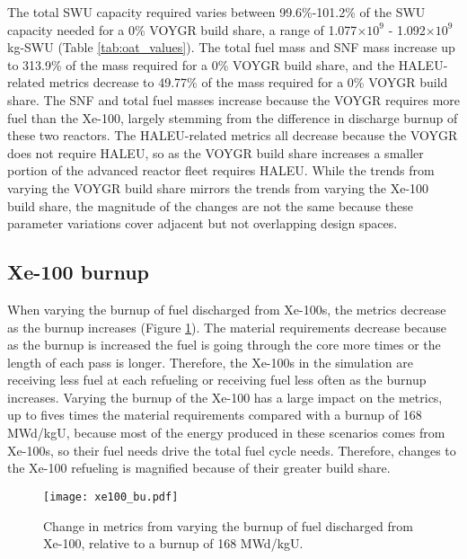 The total \gls{SWU} capacity required varies between 99.6\%-101.2\% of the 
\gls{SWU} capacity needed for a 0\% VOYGR build share, a range of 1.077$\times 10^9$
- 1.092$\times 10^9$ kg-SWU (Table \ref{tab:oat_values}). The total fuel mass 
and \gls{SNF} mass increase 
up to 313.9\% of the mass required for a 0\% VOYGR build share, and the 
\gls{HALEU}-related metrics decrease to 49.77\% of the mass required 
for a 0\% VOYGR build share. The \gls{SNF} and total fuel masses increase 
because the VOYGR requires more fuel than the Xe-100, largely stemming from 
the difference in discharge burnup of these two reactors. The \gls{HALEU}-related 
metrics all decrease because the VOYGR does not require \gls{HALEU}, so as the 
VOYGR build share increases a smaller portion of the advanced reactor fleet 
requires \gls{HALEU}. While the trends from varying the VOYGR build share 
mirrors the trends from varying the Xe-100 build share, the magnitude of the 
changes are not the same because these 
parameter variations cover adjacent but not overlapping design spaces. 

\subsection{Xe-100 burnup}
When varying the burnup of fuel discharged from Xe-100s, the metrics decrease 
as the burnup increases (Figure \ref{fig:xe100_bu_s7}). The material 
requirements decrease because as 
the burnup is increased the fuel is going through the core more times or the 
length of each pass is longer. Therefore, the Xe-100s in the simulation are receiving 
less fuel at each refueling or receiving fuel less often as the burnup increases. 
Varying the burnup of the Xe-100 has a large impact on the metrics, up to fives times 
the material requirements compared with a burnup of 168 MWd/kgU, because most of 
the energy produced in these scenarios comes from Xe-100s, so their fuel needs 
drive the total fuel cycle needs. Therefore, changes to the Xe-100 refueling is 
magnified because of their greater build share. 

\begin{figure}
    \centering
    \texttt{[image: xe100\_bu.pdf]}
    \caption{Change in metrics from varying the burnup of fuel 
    discharged from Xe-100, relative to a burnup of 168 MWd/kgU.}
    \label{fig:xe100_bu_s7}
\end{figure}

